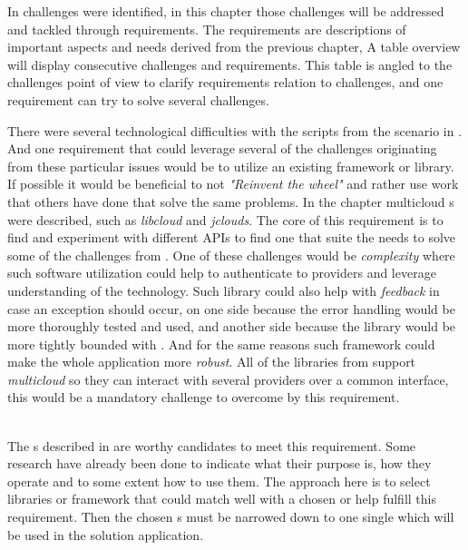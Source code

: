

In  challenges were identified, in this chapter those challenges
will be addressed and tackled through requirements.
The requirements are descriptions of important aspects and needs derived from the previous chapter, 
A table overview will display consecutive challenges and requirements. 
This table is angled to the challenges point of view to clarify requirements relation to challenges,
and one requirement can try to solve several challenges.

There were several technological difficulties with the scripts from the scenario in 
.
And one requirement that could leverage several of the challenges
originating from these particular issues would be to utilize an existing framework or library.
If possible it would be beneficial to not \emph{"Reinvent the wheel"} and rather use work
that others have done that solve the same problems.
In the chapter  multicloud s 
were described, such as \emph{libcloud} and \emph{jclouds}.
The core of this requirement is to find and experiment with different APIs to find one
that suite the needs to solve some of the challenges from .
One of these challenges would be \emph{complexity} where such software utilization
could help to authenticate to providers and leverage understanding of the technology.
Such library could also help with \emph{feedback} in case an exception should occur, on one
side because the error handling would be more thoroughly tested and used,
and another side because the library would be more tightly bounded with .
And for the same reasons such framework could make the whole application more \emph{robust}.
All of the libraries from  support \emph{multicloud} so they can
interact with several providers over a common interface, this would be a mandatory challenge
to overcome by this requirement.

 \\
The s described in  are worthy candidates to meet this requirement.
Some research have already been done to indicate what their purpose is, 
how they operate and to some extent how to use them.
The approach here is to select libraries or framework that could match well with a chosen
 or help fulfill this requirement.
Then the chosen s must be narrowed down to one single  which will be
used in the solution application.

